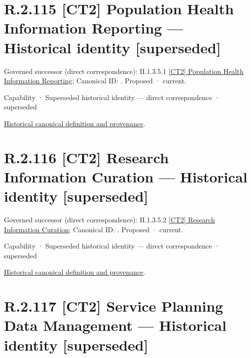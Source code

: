 \section*{R.2.115 [CT2] Population Health Information Reporting — Historical identity [superseded]}
\label{navigation:R.2.115}

{\small Governed successor (direct correspondence): II.1.3.5.1 \hyperref[element:2135b45eab034370b0063b20e821985d]{[CT2] Population Health Information Reporting}; Canonical ID: \texttt{}. Proposed · current.}\par
\label{element:ced472b2d1a54016878ee541de969d9b}
{\small Capability · Superseded historical identity — direct correspondence · superseded}\par
\href{../../../../continuum/strategy/capability/ced472b2d1a54016878ee541de969d9b.md}{Historical canonical definition and provenance}.\par
\section*{R.2.116 [CT2] Research Information Curation — Historical identity [superseded]}
\label{navigation:R.2.116}

{\small Governed successor (direct correspondence): II.1.3.5.2 \hyperref[element:4f5b8cec90324c2989cdc30e80bc8cb9]{[CT2] Research Information Curation}; Canonical ID: \texttt{}. Proposed · current.}\par
\label{element:11203b9c80964a9b96883eeab07f41d5}
{\small Capability · Superseded historical identity — direct correspondence · superseded}\par
\href{../../../../continuum/strategy/capability/11203b9c80964a9b96883eeab07f41d5.md}{Historical canonical definition and provenance}.\par
\section*{R.2.117 [CT2] Service Planning Data Management — Historical identity [superseded]}
\label{navigation:R.2.117}

